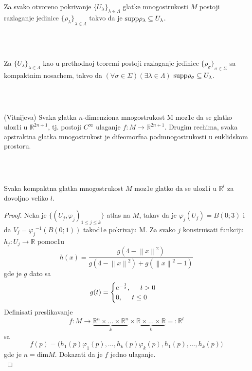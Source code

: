 \documentclass[a4paper,12pt]{article}
\newcommand{\latin}{\fontencoding{T1}\selectfont}
\newcommand{\RR}{\mathbb{R}}
\newcommand{\norm}[1]{\left\lVert#1\right\rVert}
\renewcommand{\dim}{\mathrm{dim}}
\begin{document}
\begin{tma}
Za svako otvoreno pokrivanje ${\{U_{\lambda} \}}_{\lambda \in \Lambda}$ glatke mnogostrukosti $M$ postoji razlaganje jedinice ${\{\rho_{\lambda} \}}_{\lambda \in \Lambda}$ takvo da je $\latin{\textrm{supp}} \rho_{\lambda} \subseteq U_{\lambda}$.
\end{tma}
\\ \\
\begin{tma}
Za ${\{U_{\lambda} \}}_{\lambda \in \Lambda}$ kao u prethodnoj teoremi postoji razlaganje jedinice ${\{\rho_{\sigma} \}}_{\sigma \in \Sigma}$ sa kompaktnim nosachem, takvo da $(\forall \sigma \in \Sigma)(\exists \lambda \in \Lambda)$ $\latin{\textrm{supp}} \rho_{\sigma} \subseteq U_{\lambda}$.
\end{tma}
\\ \\
\begin{tma}
(Vitnijeva) Svaka glatka $n$-dimenziona mnogostrukost M moz1e da se glatko uloz1i u $\RR^{2n+1}$, tj. postoji $C^{\infty}$ ulaganje  $f:M \to \RR^{2n+1}$. Drugim rechima, svaka apstraktna glatka mnogostrukost je difeomorfna podmnogostrukosti u euklidskom prostoru.
\end{tma}
\\ \\
\begin{tma}
Svaka kompaktna glatka mnogostrukost $M$ moz1e glatko da se uloz1i u $\RR^l$ za dovoljno veliko $l$.
\end{tma}
\begin{proof}
Neka je $\{{(U_j, \varphi_j)}_{1 \leq j \leq k} \}$ atlas na $M$, takav da je $\varphi_j(U_j) = B(0;3)$ i da $V_j = {\varphi_j}^{-1} (B(0;1))$ takod1e pokrivaju M. Za svako $j$ konstruisati funkciju $h_j : U_j \to \RR$ pomoc1u 
\[h(x) = \frac{g(4 - \norm{x}^2)}{g(4 - \norm{x}^2) + g(\norm{x}^2 - 1)}\]
gde je $g$ dato sa
\[
g(t)=
\begin{cases}
e^{-\frac{1}{t}}, \hspace{0.5cm} t>0\\
0, \hspace{0.5cm} t\leq0
\end{cases}
\]
Definisati preslikavanje \[f:M \to \underbrace{\RR^n \times \dots \times \RR^n}_{k}\times \underbrace{\RR \times \dots \times \RR}_{k} =: \RR^l\]
sa 
\[f(p) = \biggl(h_1(p)\varphi_1(p), \dots , h_k(p)\varphi_k(p), h_1(p), \dots , h_k(p)\biggr)\]
gde je $n = \dim M$. Dokazati da je $f$ jedno ulaganje.
\\
\end{proof}
\end{document}
